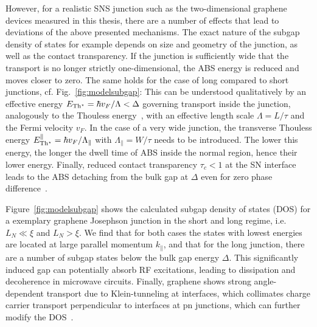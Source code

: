However, for a realistic SNS junction such as the two-dimensional graphene devices measured in this thesis, there are a number of effects that lead to deviations of the above presented mechanisms.
%
The exact nature of the subgap density of states for example depends on size and geometry of the junction, as well as the contact transparency.
%
If the junction is sufficiently wide that the transport is no longer strictly one-dimensional, the ABS energy is reduced and moves closer to zero.
%
The same holds for the case of long compared to short junctions, cf. Fig.~\ref{fig:modelsubgap}:
%
This can be understood qualitatively by an effective energy $E_{\rm Th^\star}=\hbar v_F/\Lambda<\Delta$ governing transport inside the junction, analogously to the Thouless energy~\cite{benshalomQuantumOscillationsCritical2015,schmidtBallisticGrapheneSuperconducting2018}, with an effective length scale $\Lambda=L/\tau$ and the Fermi velocity $v_F$.
%
In the case of a very wide junction, the transverse Thouless energy $E_{\rm Th^\star}^\parallel=\hbar v_F/\Lambda_\parallel$ with $\Lambda_\parallel=W/\tau$ needs to be introduced.
%
The lower this energy, the longer the dwell time of ABS inside the normal region, hence their lower energy.
%
Finally, reduced contact transparency $\tau_c<1$ at the SN interface leads to the ABS detaching from the bulk gap at $\Delta$ even for zero phase difference~\cite{bretheauTunnellingSpectroscopyAndreev2017a}.


Figure~\ref{fig:modelsubgap} shows the calculated subgap density of states (DOS) for a exemplary graphene Josephson junction in the short and long regime, i.e. $L_N\ll\xi$ and $L_N>\xi$.
%
We find that for both cases the states with lowest energies are located at large parallel momentum $k_\parallel$, and that for the long junction, there are a number of subgap states below the bulk gap energy $\Delta$.
%
This significantly induced gap can potentially absorb RF excitations, leading to dissipation and decoherence in microwave circuits.
%
Finally, graphene shows strong angle-dependent transport due to Klein-tunneling at interfaces, which collimates charge carrier transport perpendicular to interfaces at pn junctions, which can further modify the DOS~\cite{beenakkerColloquiumAndreevReflection2008}.

